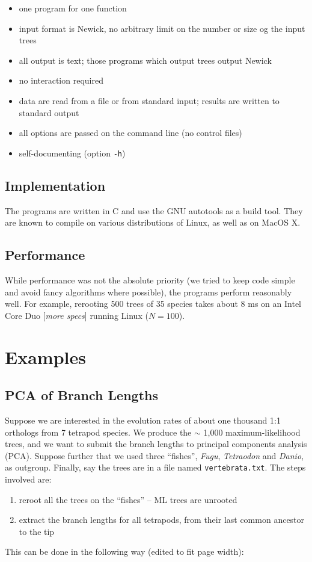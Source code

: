 \documentclass[a4paper,11pt]{article}
\begin{document}
\begin{itemize}
 \item one program for one function
 \item input format is Newick, no arbitrary limit on the number or size og the input trees
 \item all output is text; those programs which output trees output Newick
 \item no interaction required
 \item data are read from a file or from standard input; results are written to standard output
 \item all options are passed on the command line (no control files)
 \item self-documenting (option \texttt{-h})
\end{itemize}

\subsection*{Implementation}

The programs are written in C and use the \textsc{GNU} autotools as a build tool. They are known to compile on various distributions of Linux, as well as on MacOS X.

\subsection*{Performance}

While performance was not the absolute priority (we tried to keep code simple and avoid fancy algorithms where possible), the programs perform reasonably well. For example, rerooting 500 trees of 35 species takes about 8 ms on an Intel Core Duo [\textit{more specs}] running Linux ($N = 100$).

\section*{Examples}

\subsection*{PCA of Branch Lengths}

Suppose we are interested in the evolution rates of about one thousand 1:1 orthologs from 7 tetrapod species. We produce the $\sim$ 1,000 maximum-likelihood trees, and we want to submit the branch lengths to principal components analysis (\textsc{PCA}). Suppose further that we used three ``fishes'', \textit{Fugu}, \textit{Tetraodon} and \textit{Danio}, as outgroup. Finally, say the trees are in a file named \texttt{vertebrata.txt}. The steps involved are:
\begin{enumerate}
 \item reroot all the trees on the ``fishes'' -- ML trees are unrooted
 \item extract the branch lengths for all tetrapods, from their last common ancestor to the tip
\end{enumerate}
This can be done in the following way (edited to fit page width):
\end{document}
